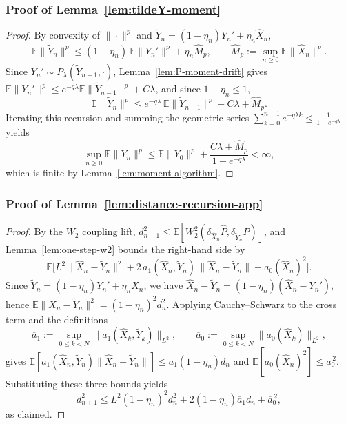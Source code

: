 \documentclass[11pt,a4paper,reqno]{amsart}
\theoremstyle{plain}
\theoremstyle{definition}
\theoremstyle{remark}
\newcommand{\E}{\mathbb{E}}
\begin{document}
\subsubsection{Proof of Lemma~\ref{lem:tildeY-moment}}
\label{subsec:proof-tildeY-moment}
\begin{proof}
By convexity of $\|\cdot\|^p$ and $\widetilde Y_n=(1-\eta_n)Y_n'+\eta_n\widehat X_n$,
\[
  \E\|\widetilde Y_n\|^p
  \le
  (1-\eta_n)\,\E\|Y_n'\|^p+\eta_n\widehat M_p,
  \qquad
  \widehat M_p:=\sup_{n\ge0}\E\|\widehat X_n\|^p.
\]
Since $Y_n'\sim P_\lambda(\widetilde Y_{n-1},\cdot)$, Lemma~\ref{lem:P-moment-drift} gives $\E\|Y_n'\|^p\le e^{-q\lambda}\E\|\widetilde Y_{n-1}\|^p+C\lambda$, and since $1-\eta_n\le1$,
\[
  \E\|\widetilde Y_n\|^p
  \le
  e^{-q\lambda}\,\E\|\widetilde Y_{n-1}\|^p+C\lambda+\widehat M_p.
\]
Iterating this recursion and summing the geometric series $\sum_{k=0}^{n-1}e^{-q\lambda k}\le \frac{1}{1-e^{-q\lambda}}$ yields
\[
  \sup_{n\ge0}\E\|\widetilde Y_n\|^p
  \le
  \E\|\widetilde Y_0\|^p+\frac{C\lambda+\widehat M_p}{1-e^{-q\lambda}}
  <\infty,
\]
which is finite by Lemma~\ref{lem:moment-algorithm}.
\end{proof}



\subsubsection{Proof of Lemma~\ref{lem:distance-recursion-app}}
\label{subsec:proof-distance-recursion}
\begin{proof}
By the $W_2$ coupling lift, $d_{n+1}^2\le\E[W_2^2(\delta_{\widehat X_n}\widehat P,\delta_{\widetilde Y_n}P)]$, and Lemma~\ref{lem:one-step-w2} bounds the right-hand side by
\[
  \E\bigl[L^2\|\widehat X_n-\widetilde Y_n\|^2
  +2\,a_1(\widehat X_n,\widetilde Y_n)\,\|\widehat X_n-\widetilde Y_n\|
  +a_0(\widehat X_n)^2\bigr].
\]
Since $\widetilde Y_n=(1-\eta_n)Y_n'+\eta_n\widehat X_n$, we have $\widehat X_n-\widetilde Y_n=(1-\eta_n)(\widehat X_n-Y_n')$, hence
$\E\|\widehat X_n-\widetilde Y_n\|^2=(1-\eta_n)^2 d_n^2$. Applying Cauchy--Schwarz to the cross term and the definitions
\[
  \overline a_1:=\sup_{0\le k<N}\|a_1(\widehat X_k,\widetilde Y_k)\|_{L^2},
  \qquad
  \overline a_0:=\sup_{0\le k<N}\|a_0(\widehat X_k)\|_{L^2},
\]
gives $\E[a_1(\widehat X_n,\widetilde Y_n)\|\widehat X_n-\widetilde Y_n\|]\le\overline a_1(1-\eta_n)d_n$ and $\E[a_0(\widehat X_n)^2]\le\overline a_0^{\,2}$. Substituting these three bounds yields
\[
  d_{n+1}^2
  \le
  L^2(1-\eta_n)^2 d_n^2
  +2(1-\eta_n)\overline a_1 d_n
  +\overline a_0^{\,2},
\]
as claimed.
\end{proof}
\end{document}
